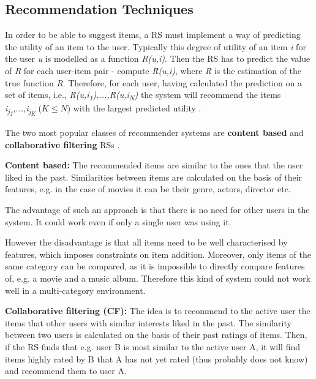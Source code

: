 \documentclass[12pt]{report}
\begin{document}

\subsection{Recommendation Techniques}

In order to be able to suggest items, a RS must implement a way of predicting the utility of an item to the user. Typically this degree of utility of an item \textit{i} for the user \textit{u} is modelled as a function \textit{R(u,i)}. Then the RS has to predict the value of \textit{R} for each user-item pair - compute \textit{\^{R}(u,i)}, where \textit{\^{R}} is the estimation of the true function \textit{R}. Therefore, for each user, having calculated the prediction on a set of items, i.e., \textit{\^{R}(u,i\textsubscript{1}),...,\^{R}(u,i\textsubscript{N})} the system will recommend the items \textit{i\textsubscript{j\textsubscript{1}},...,i\textsubscript{j\textsubscript{K}}} ($K \leq N$) with the largest predicted utility \cite{rec_sys_handbook}.

The two most popular classes of recommender systems are {\bf content based} and {\bf collaborative filtering} RSs \cite{rec_sys_handbook}.

\hbox{}
{\bf Content based:} The recommended items are similar to the ones that the user liked in the past. Similarities between items are calculated on the basis of their features, e.g. in the case of movies it can be their genre, actors, director etc.

The advantage of such an approach is that there is no need for other users in the system. It could work even if only a single user was using it.

However the disadvantage is that all items need to be well characterised by features, which imposes constraints on item addition. Moreover, only items of the same category can be compared, as it is impossible to directly compare features of, e.g. a movie and a music album. Therefore this kind of system could not work well in a multi-category environment.

\hbox{}
{\bf Collaborative filtering (CF):} The idea is to recommend to the active user the items that other users with similar interests liked in the past. The similarity between two users is calculated on the basis of their past ratings of items. Then, if the RS finds that e.g. user B is most similar to the active user A, it will find items highly rated by B that A has not yet rated (thus probably does not know) and recommend them to user A.
\end{document}

